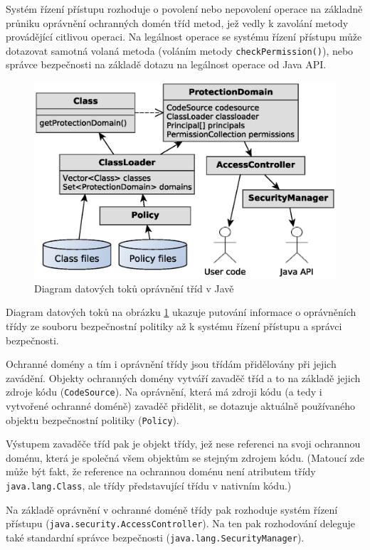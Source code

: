 Systém řízení přístupu rozhoduje o povolení nebo nepovolení operace na základně průniku oprávnění ochranných domén tříd metod, jež vedly k zavolání metody provádějící citlivou operaci. Na legálnost operace se systému řízení přístupu může dotazovat samotná volaná metoda (voláním metody {\tt checkPermission()}), nebo správce bezpečnosti na základě dotazu na legálnost operace od Java API.

\begin{figure}[ht]
  \centering
  \includegraphics[width=12cm]{fig/domain-schema}
  \caption{Diagram datových toků oprávnění tříd v Javě}
  \label{diagramDatovychToku}
\end{figure}

Diagram datových toků na obrázku \ref{diagramDatovychToku} ukazuje putování informace o oprávněních třídy ze souboru bezpečnostní politiky až k systému řízení přístupu a správci bezpečnosti.

Ochranné domény a tím i oprávnění třídy jsou třídám přidělovány při jejich zavádění. Objekty ochranných domény vytváří zavaděč tříd a to na základě jejich zdroje kódu ({\tt CodeSource}). Na oprávnění, která má zdroji kódu (a tedy i vytvořené ochranné doméně) zavaděč přidělit, se dotazuje aktuálně používaného objektu bezpečnostní politiky ({\tt Policy}).

Výstupem zavaděče tříd pak je objekt třídy, jež nese referenci na svoji ochrannou doménu, která je společná všem objektům se stejným zdrojem kódu. (Matoucí zde může být fakt, že reference na ochrannou doménu není atributem třídy {\tt java.lang.Class}, ale třídy představující třídu v nativním kódu.)

Na základě oprávnění v ochranné doméně třídy pak rozhoduje systém řízení přístupu ({\tt java.security.AccessController}). Na ten pak rozhodování deleguje také standardní správce bezpečnosti ({\tt java.lang.SecurityManager}).

